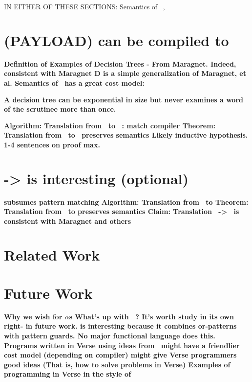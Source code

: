 \documentclass[manuscript,screen,review, 12pt]{acmart}
\begin{document}
IN EITHER OF THESE SECTIONS: Semantics of \PPlus\ , \VMinus

\section{(PAYLOAD) {\VMinus} can be compiled to }
\begin{outline}[enumerate]
    \1 \bf{Definition of \D }
    \1 \bf{Examples of Decision Trees - From Maragnet. }
    \2 \bf{Indeed, consistent with Maragnet }
    \1 \bf{D is a simple generalization of Maragnet, et al. }
    \1 \bf{Semantics of \D }
    \1 \bf{\D\ has a great cost model: }

    \bf{A decision tree can be exponential in size but never examines a word of
    the scrutinee more than once. }

    \1 \bf{Algorithm: Translation from \VMinus\ to \D\ : match compiler }
    \1 \bf{Theorem: Translation from \VMinus\ to \D\ preserves semantics }
    \2 \bf{Likely inductive hypothesis. 1-4 sentences on proof max. }
\end{outline}

\section{\PPlus -> \VMinus is interesting (optional)}
\begin{outline}[enumerate]
    \1 \bf{\VMinus subsumes pattern matching }
    \1 \bf{Algorithm: Translation from \PPlus\ to \VMinus}
    \1 \bf{Theorem: Translation from \PPlus\ to \VMinus preserves semantics }
    \1 \bf{Claim: Translation \PPlus\ -> \D\ is consistent with Maragnet and others}
\end{outline}

\section{Related Work}
\section{Future Work}
\begin{outline}[enumerate]
    \1 \bf{Why we wish for $\alpha$s}
    \1 \bf{What's up with \PPlus\ ? It's worth study in its own right- in future work.}
    \2 \bf{\PPlus is interesting because it combines or-patterns with pattern }
        guards. No major functional language does this. 
    \1 \bf{Programs written in Verse using ideas from \VMinus\ might have a }
    friendlier cost model (depending on compiler)
    \1 \bf{\VMinus might give Verse programmers good ideas }
        (That is, how to solve problems in Verse)
    \2 \bf{Examples of programming in Verse in the style of \VMinus }
\end{outline}
\end{document}
